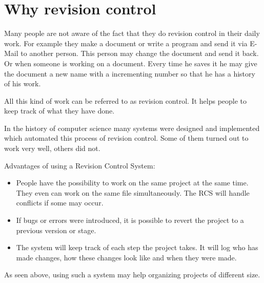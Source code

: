 \section{Why revision control} \label{whyrevisioncontrol}

\cite[Chapter 1]{hgbook2009}

Many people are not aware of the fact that they do revision control in their daily work. For example they make a document or write a program and send it via E-Mail to another person. This person may change the document and send it back. Or when someone is working on a document. Every time he saves it he may give the document a new name with a incrementing number so that he has a history of his work.

All this kind of work can be referred to as revision control. It helps people to keep track of what they have done.

In the history of computer science many systems were designed and implemented which automated this process of revision control. Some of them turned out to work very well, others did not.

Advantages of using a Revision Control System:
\begin{itemize}
\item People have the possibility to work on the same project at the same time. They even can work on the same file simultaneously. The RCS will handle conflicts if some may occur.
\item If bugs or errors were introduced, it is possible to revert the project to a previous version or stage.
\item The system will keep track of each step the project takes. It will log who has made changes, how these changes look like and when they were made.
\end{itemize}

As seen above, using such a system may help organizing projects of different size.
